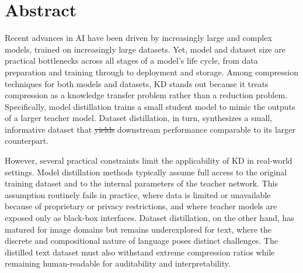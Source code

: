 \documentclass[12pt, a4paper, twoside]{book}
\makeatletter
\numberwithin{equation}{chapter}
\theoremstyle{plain}
\theoremstyle{definition}
\theoremstyle{remark}
\newenvironment{foldable}{}{}
\providecommand{\DIFaddtex}[1]{{\protect\color{blue}\uwave{#1}}} %
\providecommand{\DIFdeltex}[1]{{\protect\color{red}\sout{#1}}} %
\providecommand{\DIFaddbegin}{} %
\providecommand{\DIFaddend}{} %
\providecommand{\DIFdelbegin}{} %
\providecommand{\DIFdelend}{} %
\providecommand{\DIFadd}[1]{\texorpdfstring{\DIFaddtex{#1}}{#1}} %
\providecommand{\DIFdel}[1]{\texorpdfstring{\DIFdeltex{#1}}{}} %
\newcommand{\DIFscaledelfig}{0.5}
\newlength{\DIFdelgraphicswidth} %
\newlength{\DIFdelgraphicsheight} %
\newcommand{\DIFaddincludegraphics}[2][]{{\color{blue}\fbox{\DIFOincludegraphics[#1]{#2}}}} %
\newcommand{\DIFdelincludegraphics}[2][]{%
\sbox{\DIFdelgraphicsbox}{\DIFOincludegraphics[#1]{#2}}%
\settoboxwidth{\DIFdelgraphicswidth}{\DIFdelgraphicsbox} %
\settoboxtotalheight{\DIFdelgraphicsheight}{\DIFdelgraphicsbox} %
\scalebox{\DIFscaledelfig}{%
\parbox[b]{\DIFdelgraphicswidth}{\usebox{\DIFdelgraphicsbox}\\[-\baselineskip] \rule{\DIFdelgraphicswidth}{0em}}\llap{\resizebox{\DIFdelgraphicswidth}{\DIFdelgraphicsheight}{%
\setlength{\unitlength}{\DIFdelgraphicswidth}%
\begin{picture}(1,1)%
\thicklines\linethickness{2pt} %
{\color[rgb]{1,0,0}\put(0,0){\framebox(1,1){}}}%
{\color[rgb]{1,0,0}\put(0,0){\line( 1,1){1}}}%
{\color[rgb]{1,0,0}\put(0,1){\line(1,-1){1}}}%
\end{picture}%
}\hspace*{3pt}}} %
} %
\DeclareRobustCommand{\DIFaddbegin}{\DIFOaddbegin \let\includegraphics\DIFaddincludegraphics} %
\DeclareRobustCommand{\DIFaddend}{\DIFOaddend \let\includegraphics\DIFOincludegraphics} %
\DeclareRobustCommand{\DIFdelbegin}{\DIFOdelbegin \let\includegraphics\DIFdelincludegraphics} %
\DeclareRobustCommand{\DIFdelend}{\DIFOaddend \let\includegraphics\DIFOincludegraphics} %
\let\sout@orig\sout %
\renewcommand{\sout}[1]{\ifmmode\text{\sout@orig{\ensuremath{#1}}}\else\sout@orig{#1}\fi} %
\makeatother
\begin{document}
\newpage





\chapter*{Abstract} \label{sec:03-abstract}

\begin{foldable}
  Recent advances in \acl{AI} have been driven by increasingly large and complex models, trained on increasingly large datasets.
  Yet, model and dataset size are practical bottlenecks across all stages of a model's life cycle, from data preparation and training through to deployment and storage.
  Among compression techniques for both models and datasets, \ac{KD} stands out because it treats compression as a knowledge transfer problem rather than a reduction problem.
  Specifically, model distillation trains a small student model to mimic the outputs of a larger teacher model.
  Dataset distillation, in turn, synthesizes a small, informative dataset that \DIFdelbegin \DIFdel{yields }\DIFdelend \DIFaddbegin \DIFadd{aims to yield }\DIFaddend downstream performance comparable to its larger counterpart.
\end{foldable}

\begin{foldable}
  However, several practical constraints limit the applicability of \ac{KD} in real-world settings.
  Model distillation methods typically assume full access to the original training dataset and to the internal parameters of the teacher network.
  This assumption routinely fails in practice, where data is limited or unavailable because of proprietary or privacy restrictions, and where teacher models are exposed only as black-box interfaces.
  Dataset distillation, on the other hand, has matured for image domains but remains underexplored for text, where the discrete and compositional nature of language poses distinct challenges.
  The distilled text dataset must also withstand extreme compression ratios while remaining human-readable for auditability and interpretability.
\end{foldable}
\end{document}
